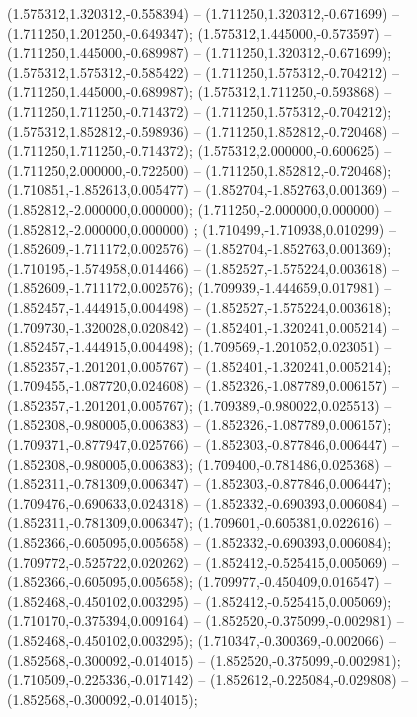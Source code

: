  (1.575312,1.320312,-0.558394) -- (1.711250,1.320312,-0.671699) -- (1.711250,1.201250,-0.649347);
 (1.575312,1.445000,-0.573597) -- (1.711250,1.445000,-0.689987) -- (1.711250,1.320312,-0.671699);
 (1.575312,1.575312,-0.585422) -- (1.711250,1.575312,-0.704212) -- (1.711250,1.445000,-0.689987);
 (1.575312,1.711250,-0.593868) -- (1.711250,1.711250,-0.714372) -- (1.711250,1.575312,-0.704212);
 (1.575312,1.852812,-0.598936) -- (1.711250,1.852812,-0.720468) -- (1.711250,1.711250,-0.714372);
 (1.575312,2.000000,-0.600625) -- (1.711250,2.000000,-0.722500) -- (1.711250,1.852812,-0.720468);
 (1.710851,-1.852613,0.005477) -- (1.852704,-1.852763,0.001369) -- (1.852812,-2.000000,0.000000);
 (1.711250,-2.000000,0.000000) -- (1.852812,-2.000000,0.000000) ;
 (1.710499,-1.710938,0.010299) -- (1.852609,-1.711172,0.002576) -- (1.852704,-1.852763,0.001369);
 (1.710195,-1.574958,0.014466) -- (1.852527,-1.575224,0.003618) -- (1.852609,-1.711172,0.002576);
 (1.709939,-1.444659,0.017981) -- (1.852457,-1.444915,0.004498) -- (1.852527,-1.575224,0.003618);
 (1.709730,-1.320028,0.020842) -- (1.852401,-1.320241,0.005214) -- (1.852457,-1.444915,0.004498);
 (1.709569,-1.201052,0.023051) -- (1.852357,-1.201201,0.005767) -- (1.852401,-1.320241,0.005214);
 (1.709455,-1.087720,0.024608) -- (1.852326,-1.087789,0.006157) -- (1.852357,-1.201201,0.005767);
 (1.709389,-0.980022,0.025513) -- (1.852308,-0.980005,0.006383) -- (1.852326,-1.087789,0.006157);
 (1.709371,-0.877947,0.025766) -- (1.852303,-0.877846,0.006447) -- (1.852308,-0.980005,0.006383);
 (1.709400,-0.781486,0.025368) -- (1.852311,-0.781309,0.006347) -- (1.852303,-0.877846,0.006447);
 (1.709476,-0.690633,0.024318) -- (1.852332,-0.690393,0.006084) -- (1.852311,-0.781309,0.006347);
 (1.709601,-0.605381,0.022616) -- (1.852366,-0.605095,0.005658) -- (1.852332,-0.690393,0.006084);
 (1.709772,-0.525722,0.020262) -- (1.852412,-0.525415,0.005069) -- (1.852366,-0.605095,0.005658);
 (1.709977,-0.450409,0.016547) -- (1.852468,-0.450102,0.003295) -- (1.852412,-0.525415,0.005069);
 (1.710170,-0.375394,0.009164) -- (1.852520,-0.375099,-0.002981) -- (1.852468,-0.450102,0.003295);
 (1.710347,-0.300369,-0.002066) -- (1.852568,-0.300092,-0.014015) -- (1.852520,-0.375099,-0.002981);
 (1.710509,-0.225336,-0.017142) -- (1.852612,-0.225084,-0.029808) -- (1.852568,-0.300092,-0.014015);
